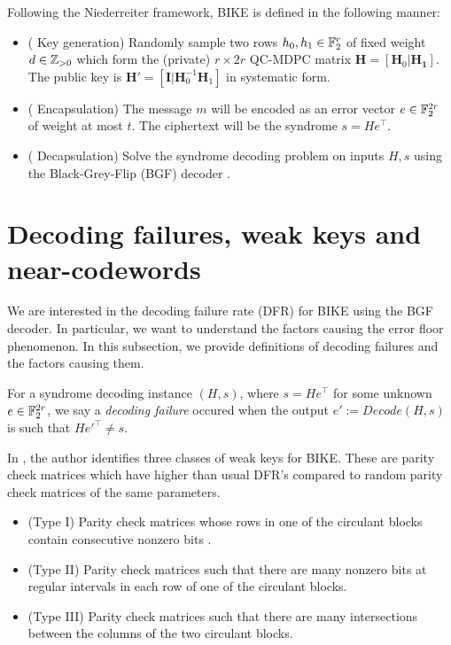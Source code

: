 Following the Niederreiter framework, BIKE is defined in the following manner:

\begin{itemize}
\item ( Key generation) Randomly sample two rows $h_0, h_1 \in \mathbb{F}_2^r$ of fixed weight $d \in \mathbb{Z}_{> 0}$ which form the (private) $r \times 2r$ QC-MDPC matrix $\mathbf{H} = [ \mathbf{H}_0 | \mathbf{H_1}]$. The public key is $\mathbf{H}' = [\mathbf{I} | \mathbf{H}_0^{-1}\mathbf{H}_1]$ in systematic form.
\item ( Encapsulation) The message $m$ will be encoded as an error vector $e \in \mathbb{F}_2^{2r}$ of weight at  most $t$. The ciphertext will be the syndrome $s = He^\top$.
\item ( Decapsulation) Solve the syndrome decoding problem on inputs $H,s$ using the Black-Grey-Flip (BGF) decoder \cite{bgf}.
\end{itemize}


\section{Decoding failures, weak keys and near-codewords}

We are interested in the decoding failure rate (DFR) for BIKE using the BGF decoder. In particular, we want to understand the factors causing the error floor phenomenon. In this subsection, we provide definitions of decoding failures and the factors causing them.

\begin{defn}
For a syndrome decoding instance $(H,s)$, where $s = He^\top$ for some unknown $e \in \mathbb{F}_2^{2r}$, we say a \textit{decoding failure} occured when the output $e' := Decode(H,s)$ is such that $He'^\top \neq s$.
\end{defn}

In \cite{Vasseur-thesis}, the author identifies three classes of weak keys for BIKE. These are parity check matrices which have higher than usual DFR's compared to random parity check matrices of the same parameters.

\begin{itemize}
\item (Type I) Parity check matrices whose rows in one of the circulant blocks contain consecutive nonzero bits \cite{DGK20b}.
\item (Type II) Parity check matrices such that there are many nonzero bits at regular intervals in each row of one of the circulant blocks.
\item (Type III) Parity check matrices such that there are many intersections between the columns of the two circulant blocks.
\end{itemize}

